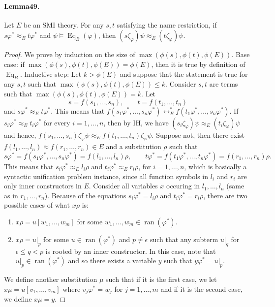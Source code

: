 \documentclass[10pt,a4paper]{amsart}
\begin{document}
\paragraph{Lemma49.} Let $E$ be an SMI theory. For any $s,t$ satisfying the name restriction, if $s\varphi^*\approx_Et\varphi^*$ and $\psi\models\operatorname{Eq}_B(\varphi)$, then $(s\zeta_\varphi)\psi\approx_E(t\zeta_\varphi)\psi$.
\begin{proof}
We prove by induction on the size of $\max(\phi(s),\phi(t),\phi(E))$.
Base case: if $\max(\phi(s),\phi(t),\phi(E))=\phi(E)$, then it is true by definition of $\operatorname{Eq}_B$.
Inductive step: Let $k>\phi(E)$ and suppose that the statement is true for any $s,t$ such that $\max(\phi(s),\phi(t),\phi(E))\le k$.
Consider $s,t$ are terms such that $\max(\phi(s),\phi(t),\phi(E))=k$. Let
\[
s=f(s_1,\ldots,s_n),\qquad t=f(t_1,\ldots,t_n)
\]
and $s\varphi^*\approx_Et\varphi^*$.
This means that $f(s_1\varphi^*,\ldots,s_n\varphi^*)\leftrightarrow_E^*f(t_1\varphi^*,\ldots,s_n\varphi^*)$.
If $s_i\varphi^*\approx_Et_i\varphi^*$ for every $i=1,\ldots,n$, then by IH, we have $(s_i\zeta_\varphi)\psi\approx_E(t_i\zeta_\varphi)\psi$ and hence, $f(s_1,\ldots,s_n)\zeta_\varphi\psi\approx_E f(t_1,\ldots,t_n)\zeta_\varphi\psi$.
Suppose not, then there exist $f(l_1,\ldots,l_n)\approx f(r_1,\ldots,r_n)\in E$ and a substitution $\rho$ such that
\[
s\varphi^*=f(s_1\varphi^*,\ldots,s_n\varphi^*)=f(l_1,\ldots,l_n)\rho,
\qquad t\varphi^*=f(t_1\varphi^*,\ldots,t_n\varphi^*)=f(r_1,\ldots,r_n)\rho.
\]
This means that $s_i\varphi^*\approx_El_i\rho$ and $t_i\varphi^*\approx_Er_i\rho$, for $i=1,\ldots,n$, which is basically a syntactic unification problem instance, since all function symbols in $l_i$ and $r_i$ are only inner constructors in $E$.
Consider all variables $x$ occuring in $l_1,\ldots,l_n$ (same as in $r_1,\ldots,r_n$). Because of the equations $s_i\varphi^*=l_i\rho$ and $t_i\varphi^*=r_i\rho$, there are two possible cases of what $x\rho$ is:
\begin{enumerate}
\item $x\rho=u[w_1,\ldots,w_m]$ for some $w_1,\ldots,w_m\in\operatorname{ran}(\varphi^*)$.
\item $x\rho=u|_p$ for some $u\in\operatorname{ran}(\varphi^*)$ and $p\ne\epsilon$ such that any subterm $u|_q$ for $\epsilon\le q<p$ is rooted by an inner constructor. In this case, note that $u|_p\in\operatorname{ran}(\varphi^*)$ and so there exists a variable $y$ such that $y\varphi^*=u|_p$.
\end{enumerate}
We define another substitution $\mu$ such that if it is the first case, we let $x\mu=u[v_1,\ldots,v_m]$ where $v_j\varphi^*=w_j$ for $j=1,\ldots,m$ and if it is the second case, we define $x\mu=y$.

\end{proof}
\end{document}
